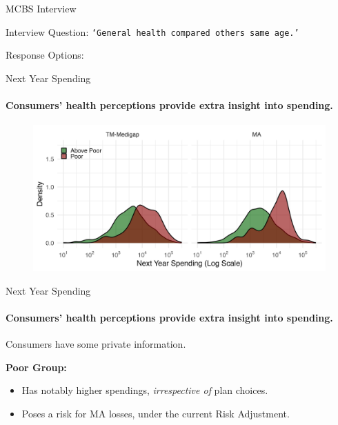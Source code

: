 \begin{frame}{MCBS Interview}

    Interview Question: \texttt{`General health compared others same age.'}

    Response Options:
    \begin{figure}
        \centering
        
    \end{figure}


\end{frame}

\begin{frame}{Next Year Spending}
    \framesubtitle{\textcolor{structure}{Consumers' health perceptions provide extra insight into spending.}}
    \begin{figure}
        \centering
        \includegraphics[width=1\textwidth]{figures/images/next_year_spending_distribution_grouped.png}
    \end{figure}
\end{frame}

\begin{frame}{Next Year Spending}
    \framesubtitle{\textcolor{structure}{Consumers' health perceptions provide extra insight into spending.}}
    Consumers have some private information.
    \vfill

    \textbf{Poor Group:}
    \begin{itemize}
        \item Has notably higher spendings, \textit{irrespective of} plan choices.
        \item Poses a risk for MA losses, under the current Risk Adjustment.
    \end{itemize}

\end{frame}

